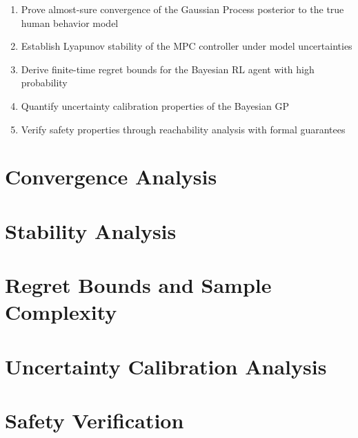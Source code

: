 \documentclass[11pt,twoside]{article}
\begin{document}
\begin{enumerate}
    \item Prove almost-sure convergence of the Gaussian Process posterior to the true human behavior model
    \item Establish Lyapunov stability of the MPC controller under model uncertainties
    \item Derive finite-time regret bounds for the Bayesian RL agent with high probability
    \item Quantify uncertainty calibration properties of the Bayesian GP
    \item Verify safety properties through reachability analysis with formal guarantees
\end{enumerate}

\section{Convergence Analysis}





\section{Stability Analysis}





\section{Regret Bounds and Sample Complexity}





\section{Uncertainty Calibration Analysis}





\section{Safety Verification}
\end{document}
